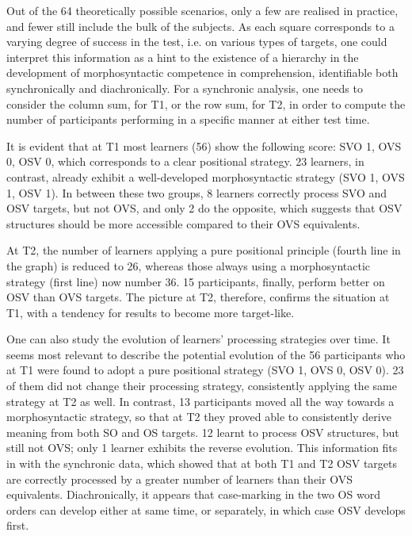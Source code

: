 Out of the 64 theoretically possible scenarios, only a few are realised in practice, and fewer still include the bulk of the subjects. As each square corresponds to a varying degree of success in the test, i.e. on various types of targets, one could interpret this information as a hint to the existence of a hierarchy in the development of morphosyntactic competence in comprehension, identifiable both synchronically and diachronically. For a synchronic analysis, one needs to consider the column sum, for T1, or the row sum, for T2, in order to compute the number of participants performing in a specific manner at either test time. 

It is evident that at T1 most learners (56) show the following score: SVO 1, OVS 0, OSV 0, which corresponds to a clear positional strategy. 23 learners, in contrast, already exhibit a well-developed morphosyntactic strategy (SVO 1, OVS 1, OSV 1). In between these two groups, 8 learners correctly process SVO and OSV targets, but not OVS, and only 2 do the opposite, which suggests that OSV structures should be more accessible compared to their OVS equivalents. 

At T2, the number of learners applying a pure positional principle (fourth line in the graph) is reduced to 26, whereas those always using a morphosyntactic strategy (first line) now number 36. 15 participants, finally, perform better on OSV than OVS targets. The picture at T2, therefore, confirms the situation at T1, with a tendency for results to become more target-like.

One can also study the evolution of learners' processing strategies over time. It seems most relevant to describe the potential evolution of the 56 participants who at T1 were found to adopt a pure positional strategy (SVO 1, OVS 0, OSV 0). 23 of them did not change their processing strategy, consistently applying the same strategy at T2 as well. In contrast, 13 participants moved all the way towards a morphosyntactic strategy, so that at T2 they proved able to consistently derive meaning from both SO and OS targets. 12 learnt to process OSV structures, but still not OVS; only 1 learner exhibits the reverse evolution. This information fits in with the synchronic data, which showed that at both T1 and T2 OSV targets are correctly processed by a greater number of learners than their OVS equivalents. Diachronically, it appears that case-marking in the two OS word orders can develop either at same time, or separately, in which case OSV develops first. 

